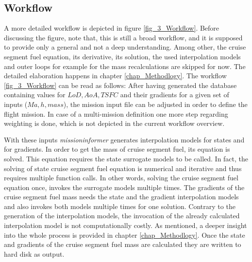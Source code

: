 \subsection{Workflow}
A more detailed workflow is depicted in figure \ref{fig_3_Workflow}. 
Before discussing the figure, note that, this is still a broad workflow, and 
it is supposed to provide only a general and not a deep understanding. Among 
other, the cruise segment fuel equation, its derivative, its solution, the used 
interpolation models and outer loops for example for the mass recalculations 
are skipped for now. The
detailed elaboration happens in chapter \ref{chap_Methodlogy}. 
The workflow \ref{fig_3_Workflow} can be read as follows: After 
having generated the 
database containing values for $LoD, AoA, TSFC$ and their 
gradients for a given set of inputs ($Ma,h, mass$), the mission input file 
can be adjusted in order to define the flight mission. In case of 
a multi-mission definition one more step regarding weighting is done, which 
is not depicted in the current workflow overview.
\begin{sidewaysfigure} [!h]
    \resizebox{\textwidth}{!}{
    
    }
    \caption{Second workflow overview with some more details}
    \label{fig_3_Workflow}
\end{sidewaysfigure}
With these 
inputs \emph{missioninformer} generates interpolation models for states and 
for gradients. In order to get the mass of cruise segment fuel,  
its equation is solved. This equation requires the state 
surrogate models to be called. In fact, the solving of 
state cruise segment fuel equation is numerical and iterative and thus requires 
multiple function calls. In other words,  
solving the cruise segment fuel equation once, invokes 
the surrogate models multiple times. The gradients of 
the cruise segment fuel mass needs the state and the gradient 
interpolation models and also invokes both models 
multiple times for one solution. Contrary to the 
generation of the interpolation models, the invocation of 
the already calculated interpolation model is not 
computationally costly. As mentioned, a deeper insight into 
the whole process is provided in 
chapter \ref{chap_Methodlogy}. Once the state and gradients 
of the cruise segment fuel mass are calculated they are written to 
hard disk as output.


    
